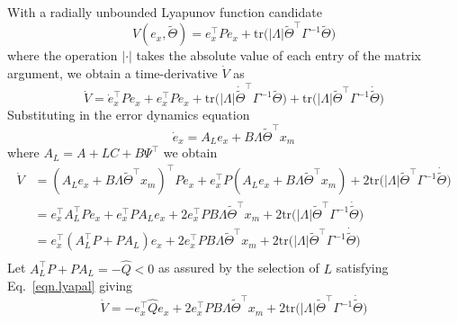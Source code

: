 \documentclass[]{../sty/JGCD}
\theoremstyle{examplestyle}
\begin{document}
  \begin{proof-dan}
    With a radially unbounded Lyapunov function candidate
    \begin{equation}
      \label{eqn.lyapfunction}
      V(e_{x},\widetilde{\Theta})=e_{x}^{\top}Pe_{x}+\text{tr}\bigr(|\Lambda|\widetilde{\Theta}^{\top}\Gamma^{-1}\widetilde{\Theta}\bigr)
    \end{equation}
    where the operation $|\cdot|$ takes the absolute value of each entry of the matrix argument, we obtain a time-derivative $\dot{V}$ as
    \begin{equation*}
      \dot{V}=\dot{e}_{x}^{\top}Pe_{x}+e_{x}^{\top}P\dot{e}_{x}+\text{tr}\bigr(|\Lambda|\dot{\widetilde{\Theta}}^{\top}\Gamma^{-1}\widetilde{\Theta}\bigr)+\text{tr}\bigr(|\Lambda|\widetilde{\Theta}^{\top}\Gamma^{-1}\dot{\widetilde{\Theta}}\bigr)
    \end{equation*}
    Substituting in the error dynamics equation
    \begin{equation*}
      \dot{e}_{x} = A_{L}e_{x}+B\Lambda\widetilde{\Theta}^{\top}x_{m}
    \end{equation*}
    where $A_{L} = A + LC + B\Psi^{\top}$ we obtain
    \begin{equation*}
      \begin{split}
        \dot{V}
        &=
        (A_{L}e_{x}+B\Lambda\widetilde{\Theta}^{\top}x_{m} )^{\top}Pe_{x}+e_{x}^{\top}P(A_{L}e_{x}+B\Lambda\widetilde{\Theta}^{\top}x_{m})+2\text{tr}\bigr(|\Lambda|\widetilde{\Theta}^{\top}\Gamma^{-1}\dot{\widetilde{\Theta}}\bigr) \\
        &=
        e_{x}^{\top}A_{L}^{\top}Pe_{x}+e_{x}^{\top}PA_{L}e_{x}+2e_{x}^{\top}PB\Lambda\widetilde{\Theta}^{\top}x_{m}+2\text{tr}\bigr(|\Lambda|\widetilde{\Theta}^{\top}\Gamma^{-1}\dot{\widetilde{\Theta}}\bigr) \\
        &=
        e_{x}^{\top}(A_{L}^{\top}P+PA_{L})e_{x}+2e_{x}^{\top}PB\Lambda\widetilde{\Theta}^{\top}x_{m}+2\text{tr}\bigr(|\Lambda|\widetilde{\Theta}^{\top}\Gamma^{-1}\dot{\widetilde{\Theta}}\bigr) \\
      \end{split}
    \end{equation*}
    Let $A_{L}^{\top}P+PA_{L}=-\widehat{Q}<0$ as assured by the selection of $L$ satisfying Eq.\ \eqref{eqn.lyapal} giving
    \begin{equation*}
      \dot{V}=-e_{x}^{\top}\widehat{Q}e_{x}+2e_{x}^{\top}PB\Lambda\widetilde{\Theta}^{\top}x_{m}+2\text{tr}\bigr(|\Lambda|\widetilde{\Theta}^{\top}\Gamma^{-1}\dot{\widetilde{\Theta}}\bigr)

\end{equation*}
\end{proof-dan}
\end{document}
